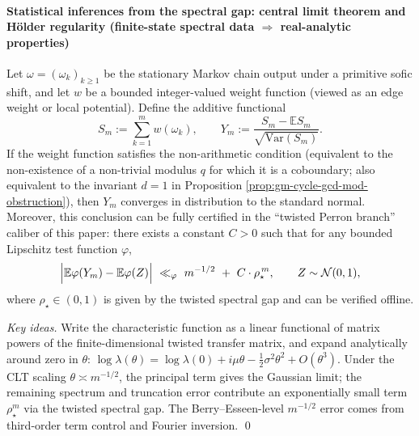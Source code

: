 \begin{proposition}
\paragraph{Statistical inferences from the spectral gap: central limit theorem and H\"older regularity (finite-state spectral data \texorpdfstring{$\Rightarrow$}{=>} real-analytic properties)}
\begin{theorem}\label{thm:gm-sofic-spectral-clt}
Let \(\omega=(\omega_k)_{k\ge 1}\) be the stationary Markov chain output under a primitive sofic shift, and let \(w\) be a bounded integer-valued weight function (viewed as an edge weight or local potential).
Define the additive functional
\[
S_m:=\sum_{k=1}^{m} w(\omega_k),
\qquad
Y_m:=\frac{S_m-\mathbb{E}S_m}{\sqrt{\mathrm{Var}(S_m)}}.
\]
If the weight function satisfies the non-arithmetic condition (equivalent to the non-existence of a non-trivial modulus \(q\) for which it is a coboundary; also equivalent to the invariant \(d=1\) in Proposition \ref{prop:gm-cycle-gcd-mod-obstruction}), then \(Y_m\) converges in distribution to the standard normal.
Moreover, this conclusion can be fully certified in the ``twisted Perron branch'' caliber of this paper: there exists a constant \(C>0\) such that for any bounded Lipschitz test function \(\varphi\),
\[
\Bigl|\mathbb{E}\varphi(Y_m)-\mathbb{E}\varphi(Z)\Bigr|
\ \ll_{\varphi}\ m^{-1/2}\ +\ C\cdot \rho_\star^{\,m},
\qquad Z\sim\mathcal{N}(0,1),
\]
where \(\rho_\star\in(0,1)\) is given by the twisted spectral gap and can be verified offline.
\end{theorem}

\begin{proof}[Key ideas]
Write the characteristic function as a linear functional of matrix powers of the finite-dimensional twisted transfer matrix, and expand analytically around zero in \(\theta\):
\(\log\lambda(\theta)=\log\lambda(0)+i\mu\theta-\tfrac12\sigma^2\theta^2+O(\theta^3)\).
Under the CLT scaling \(\theta\asymp m^{-1/2}\), the principal term gives the Gaussian limit; the remaining spectrum and truncation error contribute an exponentially small term \(\rho_\star^m\) via the twisted spectral gap.
The Berry--Esseen-level \(m^{-1/2}\) error comes from third-order term control and Fourier inversion. \qed
\end{proof}


\end{proposition}
